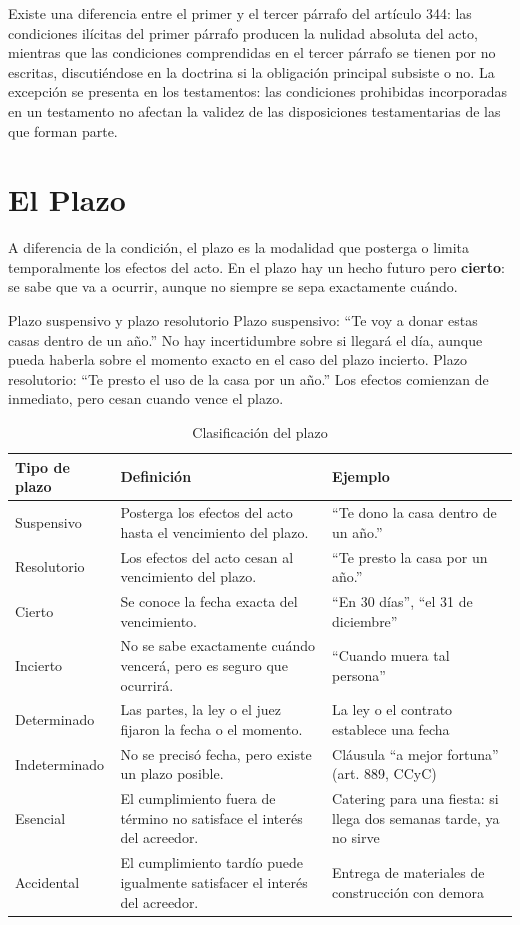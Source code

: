 \documentclass[12pt,oneside]{book}
\begin{document}
Existe una diferencia entre el primer y el tercer párrafo del artículo 344: las condiciones ilícitas del primer párrafo producen la nulidad absoluta del acto, mientras que las condiciones comprendidas en el tercer párrafo se tienen por no escritas, discutiéndose en la doctrina si la obligación principal subsiste o no. La excepción se presenta en los testamentos: las condiciones prohibidas incorporadas en un testamento no afectan la validez de las disposiciones testamentarias de las que forman parte.

\section{El Plazo}

A diferencia de la condición, el plazo es la modalidad que posterga o limita temporalmente los efectos del acto. En el plazo hay un hecho futuro pero \textbf{cierto}: se sabe que va a ocurrir, aunque no siempre se sepa exactamente cuándo.

\begin{example}{Plazo suspensivo y plazo resolutorio}
Plazo suspensivo: ``Te voy a donar estas casas dentro de un año.'' No hay incertidumbre sobre si llegará el día, aunque pueda haberla sobre el momento exacto en el caso del plazo incierto. Plazo resolutorio: ``Te presto el uso de la casa por un año.'' Los efectos comienzan de inmediato, pero cesan cuando vence el plazo.
\end{example}

\begin{table}[H]
\centering
\begin{tabularx}{\textwidth}{l X X}
\toprule
\textbf{Tipo de plazo} & \textbf{Definición} & \textbf{Ejemplo} \\
\midrule
Suspensivo & Posterga los efectos del acto hasta el vencimiento del plazo. & ``Te dono la casa dentro de un año.'' \\
Resolutorio & Los efectos del acto cesan al vencimiento del plazo. & ``Te presto la casa por un año.'' \\
Cierto & Se conoce la fecha exacta del vencimiento. & ``En 30 días'', ``el 31 de diciembre'' \\
Incierto & No se sabe exactamente cuándo vencerá, pero es seguro que ocurrirá. & ``Cuando muera tal persona'' \\
Determinado & Las partes, la ley o el juez fijaron la fecha o el momento. & La ley o el contrato establece una fecha \\
Indeterminado & No se precisó fecha, pero existe un plazo posible. & Cláusula ``a mejor fortuna'' (art. 889, CCyC) \\
Esencial & El cumplimiento fuera de término no satisface el interés del acreedor. & Catering para una fiesta: si llega dos semanas tarde, ya no sirve \\
Accidental & El cumplimiento tardío puede igualmente satisfacer el interés del acreedor. & Entrega de materiales de construcción con demora \\
\bottomrule
\end{tabularx}
\caption{Clasificación del plazo}
\end{table}
\end{document}
